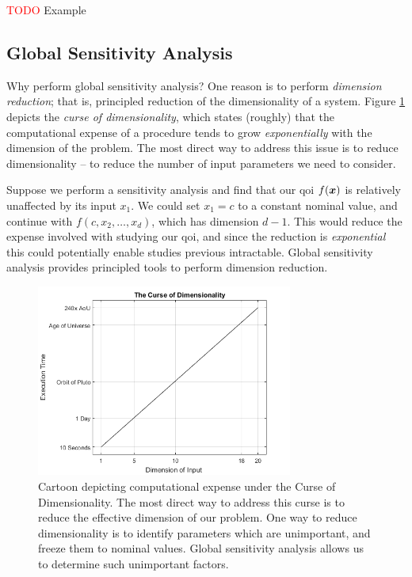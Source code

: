 \documentclass[../primer.tex]{subfiles}
\begin{document}
\textcolor{red}{TODO} Example

\subsection{Global Sensitivity Analysis}
Why perform global sensitivity analysis? One reason is to perform
\emph{dimension reduction}; that is, principled reduction of the dimensionality
of a system. Figure \ref{fig:curse} depicts the \emph{curse of dimensionality},
which states (roughly) that the computational expense of a procedure tends to
grow \emph{exponentially} with the dimension of the problem. The most direct way
to address this issue is to reduce dimensionality -- to reduce the number of
input parameters we need to consider.

Suppose we perform a sensitivity analysis and find that our qoi $f(\boldsymbol{x})$ is
relatively unaffected by its input $x_1$. We could set $x_1=c$ to a constant
nominal value, and continue with $f(c,x_2,\dots,x_d)$, which has dimension
$d-1$. This would reduce the expense involved with studying our qoi, and since
the reduction is \emph{exponential} this could potentially enable studies
previous intractable. Global sensitivity analysis provides principled tools to
perform dimension reduction.

\begin{figure}[!ht]
  \centering
  \includegraphics[width=0.75\textwidth]{./images/curse_of_dimensionality}
  \caption{Cartoon depicting computational expense under the Curse of Dimensionality.
  The most direct way to address this curse is to reduce the effective dimension
  of our problem. One way to reduce dimensionality is to identify parameters
  which are unimportant, and freeze them to nominal values. Global sensitivity
  analysis allows us to determine such unimportant factors.}
  \label{fig:curse}
\end{figure}
\end{document}

